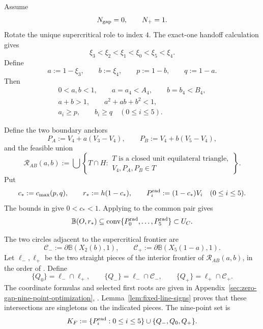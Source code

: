 

Assume
\[
 N_{\rm gap}=0,
 \qquad
 N_+=1.
\]
Rotate the unique supercritical role to index \(4\).  The exact-one handoff
calculation  gives
\begin{equation}
 \xi_3<\xi_2<\xi_1<\xi_0<\xi_5<\xi_4.
 \label{eq:reader-extreme-chain}
\end{equation}
Define
\begin{equation}
 a:=1-\xi_3,\qquad
 b:=\xi_4,\qquad
 p:=1-b,\qquad
 q:=1-a.
 \label{eq:reader-ab-parameters}
\end{equation}
Then
\begin{equation}
 \begin{gathered}
 0<a,b<1,\qquad a=a_4<A_4,\qquad b=b_4<B_4,\\
 a+b>1,\qquad a^2+ab+b^2<1,\\
 a_i\ge p,\qquad b_i\ge q\quad(0\le i\le5).
 \end{gathered}
 \label{eq:reader-ab-domain}
\end{equation}

Define the two boundary anchors
\[
 P_A:=V_4+a(V_3-V_4),
 \qquad
 P_B:=V_4+b(V_5-V_4),
\]
and the feasible union
\[
 \mathcal R_{AB}(a,b):=
 \bigcup\left\{T\cap H:
 \begin{array}{l}
 T\text{ is a closed unit equilateral triangle},\\
 V_4,P_A,P_B\in T
 \end{array}\right\}.
\]
Put
\[
 c_*:=c_{\max}(p,q),
 \qquad
 r_*:=h(1-c_*),
 \qquad
 P_i^{\rm rad}:=(1-c_*)V_i\quad(0\le i\le5).
\]
The bounds in  give $0<c_*<1$.
Applying  to the common pair gives
\begin{equation}
 \mathbb B(O,r_*)
 \subseteq\mathrm{conv}\{P_0^{\rm rad},\ldots,P_5^{\rm rad}\}
 \subset U_C.
 \label{eq:reader-forced-disk}
\end{equation}

The two circles adjacent to the supercritical frontier are
\[
 \mathcal C_-:=\partial\mathbb B(X_2(b),1),
 \qquad
 \mathcal C_+:=\partial\mathbb B(X_5(1-a),1).
\]
Let $\ell_-,\ell_+$ be the two straight pieces of the interior frontier
of $\mathcal R_{AB}(a,b)$, in the order of
. Define
\[
 \{Q_0\}=\ell_-\cap\ell_+,\qquad
 \{Q_-\}=\ell_-\cap\mathcal C_-,\qquad
 \{Q_+\}=\ell_+\cap\mathcal C_+.
\]
The coordinate formulas and selected first roots are given in
Appendix~\ref{sec:zero-gap-nine-point-optimization},
. Lemma~\ref{lem:fixed-line-signs}
proves that these intersections are singletons on the indicated pieces.
The nine-point set is
\[
 K_F:=\{P_i^{\rm rad}:0\le i\le5\}\cup\{Q_-,Q_0,Q_+\}.
\]

